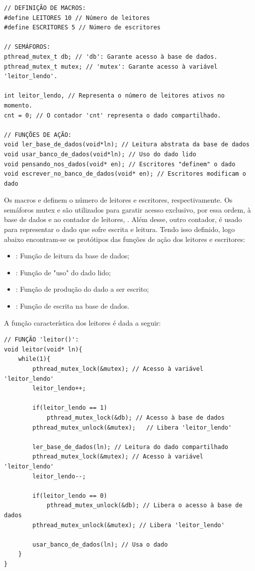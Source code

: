 \documentclass[
	12pt,				%
	openright,			%
	oneside,			%
	a4paper,			%
	chapter=TITLE,		%
	english,			%
	french,				%
	spanish,			%
	brazil				%
	]{abntex2}
\theoremstyle{definition}
\begin{document}
\begin{verbatim}
// DEFINIÇÃO DE MACROS:
#define LEITORES 10 // Número de leitores
#define ESCRITORES 5 // Número de escritores

// SEMÁFOROS:
pthread_mutex_t db; // 'db': Garante acesso à base de dados.
pthread_mutex_t mutex; // 'mutex': Garante acesso à variável 'leitor_lendo'.

int leitor_lendo, // Representa o número de leitores ativos no momento.
cnt = 0; // O contador 'cnt' representa o dado compartilhado.

// FUNÇÕES DE AÇÃO:
void ler_base_de_dados(void*ln); // Leitura abstrata da base de dados
void usar_banco_de_dados(void*ln); // Uso do dado lido
void pensando_nos_dados(void* en); // Escritores "definem" o dado
void escrever_no_banco_de_dados(void* en); // Escritores modificam o dado
\end{verbatim}

Os macros  e  definem o número de leitores e escritores, respectivamente. Os semáforos mutex  e  são utilizados para garatir acesso exclusivo, por essa ordem, à base de dados e ao contador de leitores, . Além desse, outro contador,  é usado para representar o dado que sofre escrita e leitura. Tendo isso definido, logo abaixo encontram-se os protótipos das funções de ação dos leitores e escritores:

\begin{itemize}
    \item \textbf{}: Função de leitura da base de dados;
    \item \textbf{}: Função de "uso" do dado lido;
    \item \textbf{}: Função de produção do dado a ser escrito;
    \item \textbf{}: Função de escrita na base de dados.
\end{itemize}

A função característica dos leitores é dada a seguir:

\begin{verbatim}
// FUNÇÃO 'leitor()':
void leitor(void* ln){
    while(1){
        pthread_mutex_lock(&mutex); // Acesso à variável 'leitor_lendo'
        leitor_lendo++;

        if(leitor_lendo == 1) 
            pthread_mutex_lock(&db); // Acesso à base de dados
        pthread_mutex_unlock(&mutex);   // Libera 'leitor_lendo'

        ler_base_de_dados(ln); // Leitura do dado compartilhado
        pthread_mutex_lock(&mutex); // Acesso à variável 'leitor_lendo'
        leitor_lendo--; 

        if(leitor_lendo == 0) 
            pthread_mutex_unlock(&db); // Libera o acesso à base de dados
        pthread_mutex_unlock(&mutex); // Libera 'leitor_lendo'
        
        usar_banco_de_dados(ln); // Usa o dado
    }
}
\end{verbatim}
\end{document}
